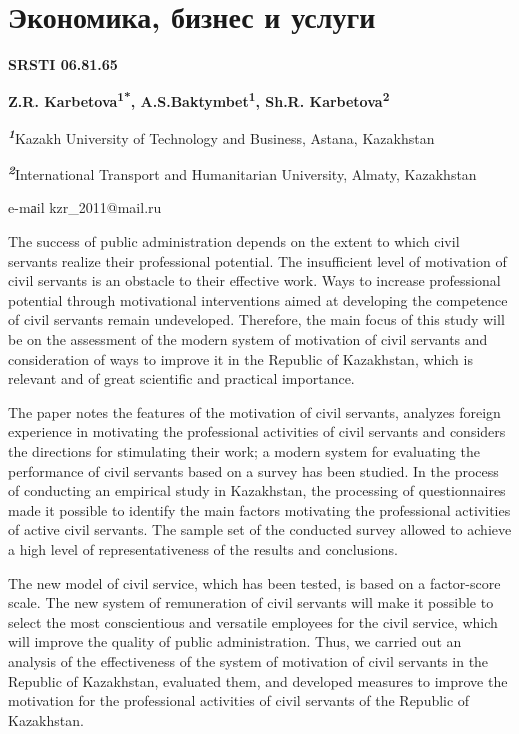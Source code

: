 \let\cleardoublepage\clearpage
\chapter{Экономика, бизнес и услуги}

{\bfseries SRSTI 06.81.65}


\begin{center}
{\bfseries Z.R. Karbetova\textsuperscript{1*},
A.S.Baktymbet\textsuperscript{1}, Sh.R. Karbetova\textsuperscript{2}}

\emph{{\bfseries \textsuperscript{1}}}Kazakh University of Technology and
Business, Astana, Kazakhstan

\emph{{\bfseries \textsuperscript{2}}}International Transport and
Humanitarian University, Almaty, Kazakhstan

e-mаil kzr\_2011@mail.ru
\end{center}

The success of public administration depends on the extent to which
civil servants realize their professional potential. The insufficient
level of motivation of civil servants is an obstacle to their effective
work. Ways to increase professional potential through motivational
interventions aimed at developing the competence of civil servants
remain undeveloped. Therefore, the main focus of this study will be on
the assessment of the modern system of motivation of civil servants and
consideration of ways to improve it in the Republic of Kazakhstan, which
is relevant and of great scientific and practical importance.

The paper notes the features of the motivation of civil servants,
analyzes foreign experience in motivating the professional activities of
civil servants and considers the directions for stimulating their work;
a modern system for evaluating the performance of civil servants based
on a survey has been studied. In the process of conducting an empirical
study in Kazakhstan, the processing of questionnaires made it possible
to identify the main factors motivating the professional activities of
active civil servants. The sample set of the conducted survey allowed to
achieve a high level of representativeness of the results and
conclusions.

The new model of civil service, which has been tested, is based on a
factor-score scale. The new system of remuneration of civil servants
will make it possible to select the most conscientious and versatile
employees for the civil service, which will improve the quality of
public administration. Thus, we carried out an analysis of the
effectiveness of the system of motivation of civil servants in the
Republic of Kazakhstan, evaluated them, and developed measures to
improve the motivation for the professional activities of civil servants
of the Republic of Kazakhstan.

